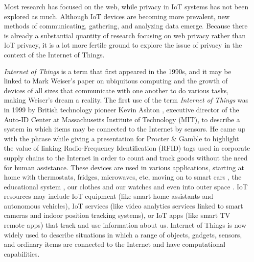 \documentclass[conference]{IEEEtran}
\begin{document}
Most research has focused on the web, while privacy in IoT systems has not
been explored as much. Although IoT devices are becoming more prevalent,
new methods of communicating, gathering, and analyzing data emerge.
Because there is already a substantial quantity of research focusing on web
privacy rather than IoT privacy, it is a lot more fertile ground to explore
the issue of privacy in the context of the Internet of Things.

\textit{Internet of Things} is a term that first appeared in the 1990s, and
it may be linked to Mark Weiser's paper on ubiquitous computing \cite{weiser1991computer}
and the growth of devices of all sizes that communicate with one another to
do various tasks, making Weiser's dream a reality. The first use of the term
\textit{Internet of Things} was in 1999 by British technology pioneer Kevin
Ashton \cite{KevinThat}, executive director of the Auto-ID Center at Massachusetts
Institute of Technology (MIT), to describe a system in which items may be
connected to the Internet by sensors. He came up with the phrase while giving
a presentation for Procter \& Gamble to highlight the value of linking
Radio-Frequency Identification (RFID) tags used in corporate supply chains
to the Internet in order to count and track goods without the need for human
assistance. These devices are used in various applications, starting at home
\cite{marikyan2019systematic} with thermostats, fridges, microwaves, etc,
moving on to smart cars \cite{arena2020overview}, the educational system
\cite{al2020survey}, our clothes and our watches \cite{niknejad2020comprehensive}
and even into outer space \cite{AkyildizInternet}. IoT resources may include
IoT equipment (like smart home assistants and autonomous vehicles), IoT services
(like video analytics services linked to smart cameras and indoor position
tracking systems), or IoT apps (like smart TV remote apps) that track and use
information about us. Internet of Things is now widely used to describe situations
in which a range of objects, gadgets, sensors, and ordinary items are connected
to the Internet and have computational capabilities.
\end{document}
